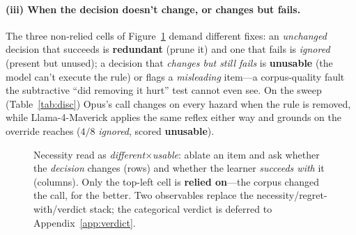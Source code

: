 \documentclass{article}
\begin{document}
\paragraph{(iii) When the decision doesn't change, or changes but fails.} The three non-relied cells of
Figure~\ref{fig:diffbetter} demand different fixes: an \emph{unchanged} decision that succeeds is
\textbf{redundant} (prune it) and one that fails is \emph{ignored} (present but unused); a decision that
\emph{changes but still fails} is \textbf{unusable} (the model can't execute the rule) or flags a
\emph{misleading} item---a corpus-quality fault the subtractive ``did removing it hurt'' test cannot even
see. On the sweep (Table~\ref{tab:disc}) Opus's call changes on every hazard when the rule is removed, while
Llama-4-Maverick applies the same reflex either way and grounds on the override reaches ($4/8$ \emph{ignored},
scored \textbf{unusable}).

\begin{figure}[t]
\centering
{}
\caption{Necessity read as \emph{different}$\times$\emph{usable}: ablate an item and ask whether the
\emph{decision} changes (rows) and whether the learner \emph{succeeds with} it (columns). Only the top-left
cell is \textbf{relied on}---the corpus changed the call, for the better. Two observables replace the
necessity/regret-with/verdict stack; the categorical verdict is deferred to Appendix~\ref{app:verdict}.}
\label{fig:diffbetter}
\end{figure}
\end{document}
